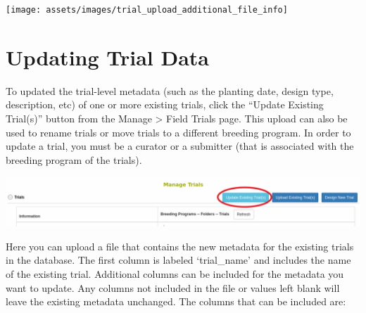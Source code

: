\documentclass[
  12pt,
]{book}
\begin{document}
\begin{center}\texttt{[image: assets/images/trial\_upload\_additional\_file\_info]} \end{center}

\hypertarget{updating-trial-data}{%
\section{Updating Trial Data}\label{updating-trial-data}}

To updated the trial-level metadata (such as the planting date, design type, description, etc) of one or more existing trials, click the ``Update Existing Trial(s)'' button from the Manage \textgreater{} Field Trials page. This upload can also be used to rename trials or move trials to a different breeding program. In order to update a trial, you must be a curator or a submitter (that is associated with the breeding program of the trials).

\begin{center}\includegraphics[width=0.95\linewidth]{assets/images/update_trial_metadata} \end{center}

Here you can upload a file that contains the new metadata for the existing trials in the database. The first column is labeled `trial\_name' and includes the name of the existing trial. Additional columns can be included for the metadata you want to update. Any columns not included in the file or values left blank will leave the existing metadata unchanged. The columns that can be included are:
\end{document}
